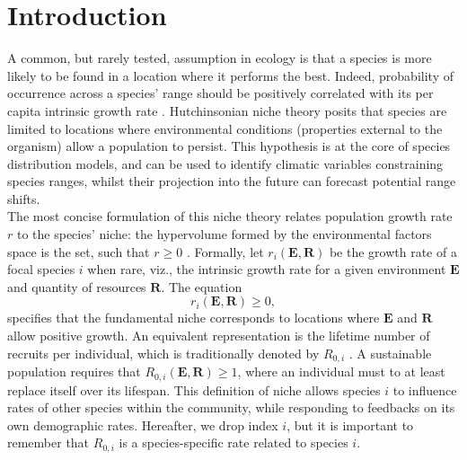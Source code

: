 
\section{Introduction}

A common, but rarely tested, assumption in ecology is that a species is more likely to be found in a location where it performs the best. Indeed, probability of occurrence across a species' range should be positively correlated with its per capita intrinsic growth rate \citep{McGill2012}. Hutchinsonian niche theory \citep{Hutchinson1957, Maguire1973} posits that species are limited to locations where environmental conditions (\ie properties external to the organism) allow a population to persist. This hypothesis is at the core of species distribution models, and can be used to identify climatic variables constraining species ranges, whilst their projection into the future can forecast potential range shifts. \\

The most concise formulation of this niche theory relates population growth rate $ r $ to the species' niche: the hypervolume formed by the environmental factors space is the set, such that $ r \geqslant 0 $ \citep{Holt2009, Godsoe2017}. Formally, let $ r_i(\bm{E}, \bm{R}) $ be the growth rate of a focal species $ i $ when rare, viz., the intrinsic growth rate for a given environment $ \bm{E} $ and quantity of resources $ \bm{R} $. The equation
\[
	r_i(\bm{E}, \bm{R}) \geqslant 0,
\]
specifies that the fundamental niche corresponds to locations where $ \bm{E} $ and $ \bm{R} $ allow positive growth. An equivalent representation is the lifetime number of recruits per individual, which is traditionally denoted by $ R_{0, i} $ \citep[where $ i $ is still the species index]{Pulliam2000, DeRoos1997}. A sustainable population requires that $ R_{0, i} (\bm{E}, \bm{R}) \geqslant 1 $, where an individual must to at least replace itself over its lifespan. This definition of niche allows species $ i $ to influence rates of other species within the community, while responding to feedbacks on its own demographic rates. Hereafter, we drop index $ i $, but it is important to remember that $ R_{0, i} $ is a species-specific rate related to species $ i $. \\

